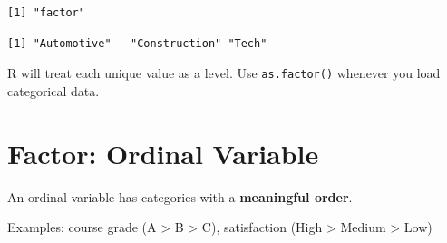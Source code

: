 \documentclass[
  letterpaper,
  DIV=11,
  numbers=noendperiod]{scrreprt}
\newenvironment{Shaded}{\begin{snugshade}}{\end{snugshade}}
\newcommand{\CommentTok}[1]{\textcolor[rgb]{0.37,0.37,0.37}{#1}}
\newcommand{\DocumentationTok}[1]{\textcolor[rgb]{0.37,0.37,0.37}{\textit{#1}}}
\newcommand{\FunctionTok}[1]{\textcolor[rgb]{0.28,0.35,0.67}{#1}}
\newcommand{\NormalTok}[1]{\textcolor[rgb]{0.00,0.23,0.31}{#1}}
\newcommand{\OtherTok}[1]{\textcolor[rgb]{0.00,0.23,0.31}{#1}}
\newcommand{\SpecialCharTok}[1]{\textcolor[rgb]{0.37,0.37,0.37}{#1}}
\begin{document}
\begin{Shaded}
\end{Shaded}

\begin{verbatim}
[1] "factor"
\end{verbatim}

\begin{Shaded}
\end{Shaded}

\begin{verbatim}
[1] "Automotive"   "Construction" "Tech"        
\end{verbatim}

R will treat each unique value as a level. Use \texttt{as.factor()}
whenever you load categorical data.

\section{Factor: Ordinal Variable}\label{factor-ordinal-variable}

An ordinal variable has categories with a \textbf{meaningful order}.

Examples: course grade (A \textgreater{} B \textgreater{} C),
satisfaction (High \textgreater{} Medium \textgreater{} Low)
\end{document}
